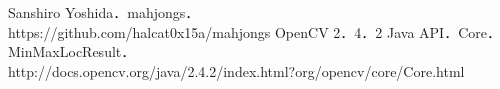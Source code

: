 \documentclass{jsarticle}
\begin{document}
\begin{multicols}{2}
%

\begin{thebibliography}{9}
	Sanshiro Yoshida．mahjongs．\\
	https://github.com/halcat0x15a/mahjongs
	OpenCV 2．4．2 Java API．Core．MinMaxLocResult．\\
	http://docs.opencv.org/java/2.4.2/index.html?org/opencv/core/Core.html
\end{thebibliography}

\end{multicols}

\begin{comment}
\newpage

\section{付録}

\subsection{画像認識}
\begin{lstlisting}[caption=TemplateMatching.scala,label=TemplateMatching]
package mahjongs.recognizer

import org.opencv.core._
import org.opencv.imgproc.Imgproc

object TemplateMatching {

  val MaxResolution: Int = 1024 * 1024

  def createTemplate(mat: Mat): Option[(IndexedSeq[Mat], Size)] = {
    crop(resize(mat, MaxResolution)).headOption.map {
      case (template, _) =>
        val mask = threshold(template.clone, true)
        val width = template.cols / 9
        val height = template.rows / 4
        floodFill(mask, (0 until 4).map(_ * height) :+ (mask.rows - 1), 0 until mask.cols)
        floodFill(mask, 0 until mask.rows, (0 until 9).map(_ * width) :+ (mask.cols - 1))
        Imgproc.dilate(mask, mask, new Mat)
        val rects = for (tiles <- grid(mask, 4, 9)) yield {
          for (tile <- tiles) yield {
            val contours = findContours(tile.clone).flatMap(_.toArray)
            if (contours.length > 0)
              Some(convexHull(contours))
            else
              None
          }
        }
        val size = rects.flatten.flatten.map(_.size).maxBy(_.area)
        val tiles = grid(template, 4, 9).zip(rects).flatMap {
          case (tiles, rects) =>
            tiles.zip(rects).map {
              case (tile, rect) =>
                Imgproc.getRectSubPix(tile, size, rect.fold(center(tile))(center), tile)
                tile
            }
        }.take(34)
        (tiles, new Size(width, height))
    }
  }


\end{comment}
\end{document}

